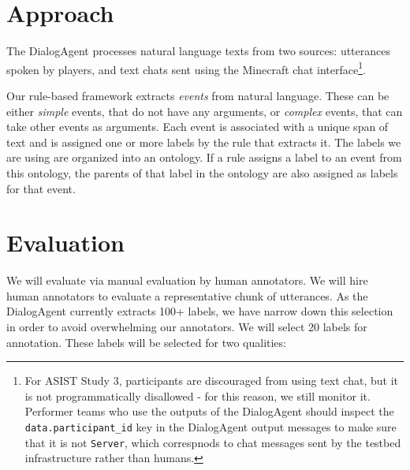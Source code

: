 \section{Approach}

The DialogAgent processes natural language texts from two sources: utterances
spoken by players, and text chats sent using the Minecraft chat
interface\footnote{For ASIST Study 3, participants are discouraged from using
    text chat, but it is not programmatically disallowed - for this reason, we
    still monitor it. Performer teams who use the outputs of the DialogAgent
    should inspect the \texttt{data.participant\_id} key in the DialogAgent
    output messages to make sure that it is not \texttt{Server}, which
correspnods to chat messages sent by the testbed infrastructure rather than
humans.}.

Our rule-based framework extracts \emph{events} from natural language. These
can be either \emph{simple} events, that do not have any arguments, or
\emph{complex} events, that can take other events as arguments. Each event is
associated with a unique span of text and is assigned one or more labels by the
rule that extracts it. The labels we are using are organized into an ontology.
If a rule assigns a label to an event from this ontology, the parents of that
label in the ontology are also assigned as labels for that event.

\section{Evaluation}

We will evaluate via manual evaluation by human annotators. We will hire human
annotators to evaluate a representative chunk of utterances. As the DialogAgent
currently extracts 100+ labels, we have narrow down this selection in order to
avoid overwhelming our annotators.  We will select 20 labels for annotation.
These labels will be selected for two qualities:

